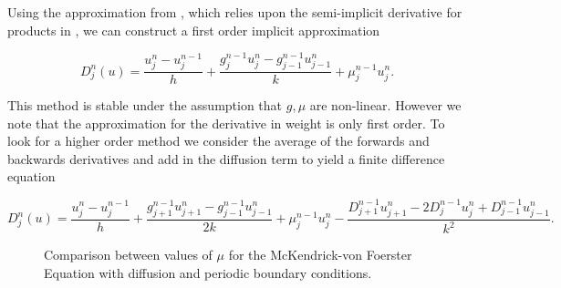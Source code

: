 \documentclass[../main.tex]{subfiles}
\begin{document}
  Using the approximation from \cite{hartvig2011}, which relies upon the semi-implicit derivative for products in \cite{press1992}, we can construct a first order implicit approximation

  \begin{equation}
    D^n_j(u) = \frac{u^n_j - u^{n-1}_j}{h} + \frac{g^{n-1}_j u^n_j - g^{n-1}_{j-1} u^n_{j-1}}{k} + \mu^{n-1}_j u^n_j.
  \end{equation}

  This method is stable under the assumption that $g, \mu$ are non-linear. However we note that the approximation for the derivative in weight is only first order. To look for a higher order method we consider the average of the forwards and backwards derivatives and add in the diffusion term to yield a finite difference equation

  \begin{equation}\label{method:eq:fullimplicit}
    D^n_j(u) = \frac{u^n_j - u^{n-1}_j}{h} + \frac{g^{n-1}_{j+1} u^n_{j+1} - g^{n-1}_{j-1} u^n_{j-1}}{2k} + \mu^{n-1}_j u^n_j - \frac{D^{n-1}_{j+1} u^n_{j+1} - 2 D^{n-1}_j u^n_j + D^{n-1}_{j-1} u^n_{j-1}}{k^2}.
  \end{equation}

  \begin{figure}[htb]
    \centering
    \caption{\label{method:fig:diffusionSolution} Comparison between values of $\mu$ for the McKendrick-von Foerster Equation with diffusion and periodic boundary conditions.}
  \end{figure}
\end{document}
